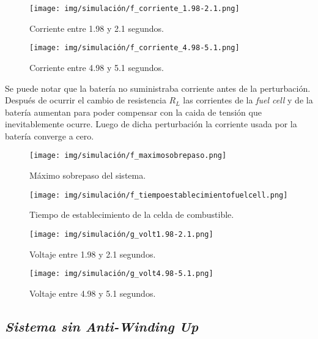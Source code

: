 \begin{figure}[H]
    \centering
    \texttt{[image: img/simulación/f\_corriente\_1.98-2.1.png]}
    \caption{Corriente entre 1.98 y 2.1 segundos.}
    \label{fig:f_corriente_1.98-2.1}
\end{figure}

\begin{figure}[H]
    \centering
    \texttt{[image: img/simulación/f\_corriente\_4.98-5.1.png]}
    \caption{Corriente entre 4.98 y 5.1 segundos.}
\label{fig:f_corriente_4.98-5.1}
\end{figure}

Se puede notar que la batería no suministraba corriente antes de la perturbación. 
Después de ocurrir el cambio de resistencia $R_L$ las corrientes de la \textit{fuel cell} y de
la batería aumentan para poder compensar con la caida de tensión que inevitablemente ocurre. 
Luego de dicha perturbación la corriente usada por la batería converge a cero. 
\begin{figure}[H]
    \centering
    \texttt{[image: img/simulación/f\_maximosobrepaso.png]}
    \caption{Máximo sobrepaso del sistema.}
\label{fig:f_maximosobrepaso}
\end{figure}

\begin{figure}[H]
    \centering
    \texttt{[image: img/simulación/f\_tiempoestablecimientofuelcell.png]}
    \caption{Tiempo de establecimiento de la celda de combustible.}
    \label{fig:f_tiempoestablecimientofuelcell}
\end{figure}



\begin{figure}[H]
    \centering
    \texttt{[image: img/simulación/g\_volt1.98-2.1.png]}
    \caption{Voltaje entre 1.98 y 2.1 segundos.}
    \label{fig:g_volt1.98-2.1}
\end{figure}

\begin{figure}[H]
    \centering
    \texttt{[image: img/simulación/g\_volt4.98-5.1.png]}
    \caption{Voltaje entre 4.98 y 5.1 segundos.}
    \label{fig:g_volt4.98-5.1}
\end{figure}

\subsection{\textit{Sistema sin Anti-Winding Up}}


